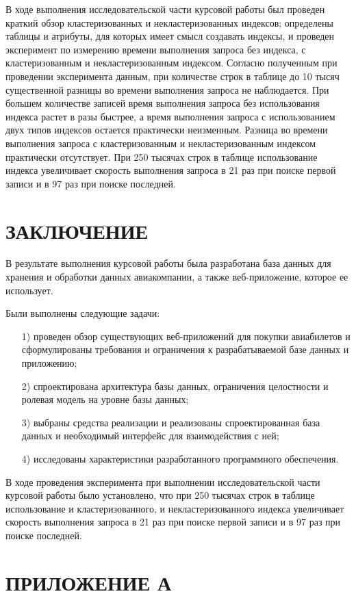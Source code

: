 \documentclass{bmstu}
\begin{document}
В ходе выполнения исследовательской части курсовой работы был проведен краткий обзор кластеризованных и некластеризованных индексов; определены таблицы и атрибуты, для которых имеет смысл создавать индексы, и проведен эксперимент по измерению времени выполнения запроса без индекса, с кластеризованным и некластеризованным индексом. 
Согласно полученным при проведении эксперимента данным, при количестве строк в таблице до 10 тысяч существенной разницы во времени выполнения запроса не наблюдается. 
При большем количестве записей время выполнения запроса без использования индекса растет в разы быстрее, а время выполнения запроса с использованием двух типов индексов остается практически неизменным. 
Разница во времени выполнения запроса с кластеризованным и некластеризованным индексом практически отсутствует. 
При 250 тысячах строк в таблице использование индекса увеличивает скорость выполнения запроса в 21 раз при поиске первой записи и в 97 раз при поиске последней.

{\centering \chapter*{ЗАКЛЮЧЕНИЕ}}

В результате выполнения курсовой работы была разработана база данных для хранения и обработки данных авиакомпании, а также веб-приложение, которое ее использует.

Были выполнены следующие задачи:

\begin{enumerate}
\item[1)] проведен обзор существующих веб-приложений для покупки авиабилетов и сформулированы требования и ограничения к разрабатываемой базе данных и приложению;
\item[2)] спроектирована архитектура базы данных, ограничения целостности и ролевая модель на уровне базы данных;
\item[3)] выбраны средства реализации и реализованы спроектированная база данных и необходимый интерфейс для взаимодействия с ней;
\item[4)] исследованы характеристики разработанного программного обеспечения.
\end{enumerate}

В ходе проведения эксперимента при выполнении исследовательской части курсовой работы было установлено, что при 250 тысячах строк в таблице использование и кластеризованного, и некластеризованного индекса увеличивает скорость выполнения запроса в 21 раз при поиске первой записи и в 97 раз при поиске последней.

{\centering \printbibliography[title=СПИСОК ИСПОЛЬЗОВАННЫХ ИСТОЧНИКОВ,heading=bibintoc]}

{\centering \chapter*{ПРИЛОЖЕНИЕ А}}
\end{document}
